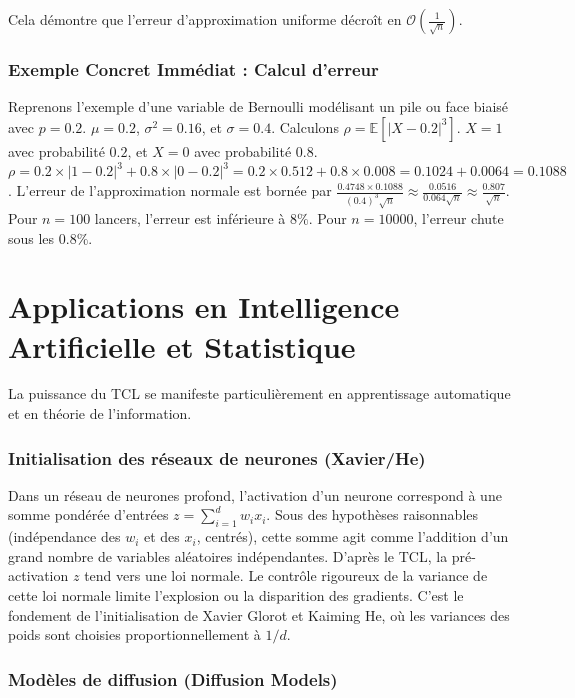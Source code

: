 \documentclass[11pt,a4paper]{article}
\begin{document}
Cela démontre que l'erreur d'approximation uniforme décroît en $\mathcal{O}\left(\frac{1}{\sqrt{n}}\right)$.

\subsubsection{Exemple Concret Immédiat : Calcul d'erreur}

Reprenons l'exemple d'une variable de Bernoulli modélisant un pile ou face biaisé avec $p=0.2$.
$\mu = 0.2$, $\sigma^2 = 0.16$, et $\sigma = 0.4$.
Calculons $\rho = \mathbb{E}[|X - 0.2|^3]$.
$X = 1$ avec probabilité $0.2$, et $X = 0$ avec probabilité $0.8$.
$\rho = 0.2 \times |1 - 0.2|^3 + 0.8 \times |0 - 0.2|^3 = 0.2 \times 0.512 + 0.8 \times 0.008 = 0.1024 + 0.0064 = 0.1088$.
L'erreur de l'approximation normale est bornée par $\frac{0.4748 \times 0.1088}{(0.4)^3 \sqrt{n}} \approx \frac{0.0516}{0.064 \sqrt{n}} \approx \frac{0.807}{\sqrt{n}}$.
Pour $n=100$ lancers, l'erreur est inférieure à $8\%$. Pour $n=10000$, l'erreur chute sous les $0.8\%$.

\section{Applications en Intelligence Artificielle et Statistique}

La puissance du TCL se manifeste particulièrement en apprentissage automatique et en théorie de l'information.

\subsubsection{Initialisation des réseaux de neurones (Xavier/He)}

Dans un réseau de neurones profond, l'activation d'un neurone correspond à une somme pondérée d'entrées $z = \sum_{i=1}^d w_i x_i$.
Sous des hypothèses raisonnables (indépendance des $w_i$ et des $x_i$, centrés), cette somme agit comme l'addition d'un grand nombre de variables aléatoires indépendantes.
D'après le TCL, la pré-activation $z$ tend vers une loi normale. Le contrôle rigoureux de la variance de cette loi normale limite l'explosion ou la disparition des gradients. C'est le fondement de l'initialisation de Xavier Glorot et Kaiming He, où les variances des poids sont choisies proportionnellement à $1/d$.

\subsubsection{Modèles de diffusion (Diffusion Models)}
\end{document}
